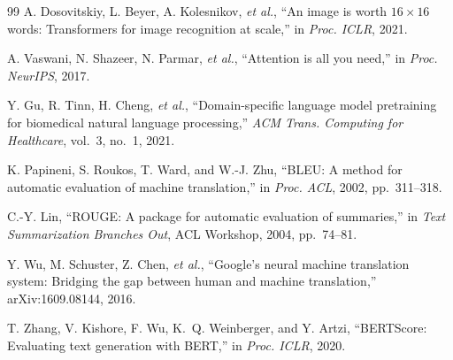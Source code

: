 \documentclass[11pt]{article}
\begin{document}
\begin{thebibliography}{99}
A. Dosovitskiy, L. Beyer, A. Kolesnikov, \emph{et al.},
``An image is worth $16\times16$ words: Transformers for image recognition at
scale,'' in \emph{Proc. ICLR}, 2021.

A. Vaswani, N. Shazeer, N. Parmar, \emph{et al.},
``Attention is all you need,'' in \emph{Proc. NeurIPS}, 2017.

Y. Gu, R. Tinn, H. Cheng, \emph{et al.},
``Domain-specific language model pretraining for biomedical natural language
processing,'' \emph{ACM Trans. Computing for Healthcare}, vol.~3, no.~1, 2021.

K. Papineni, S. Roukos, T. Ward, and W.-J. Zhu,
``BLEU: A method for automatic evaluation of machine translation,''
in \emph{Proc. ACL}, 2002, pp.~311--318.

C.-Y. Lin,
``ROUGE: A package for automatic evaluation of summaries,''
in \emph{Text Summarization Branches Out}, ACL Workshop, 2004, pp.~74--81.

Y. Wu, M. Schuster, Z. Chen, \emph{et al.},
``Google's neural machine translation system: Bridging the gap between human and
machine translation,'' arXiv:1609.08144, 2016.

T. Zhang, V. Kishore, F. Wu, K.~Q. Weinberger, and Y. Artzi,
``BERTScore: Evaluating text generation with BERT,''
in \emph{Proc. ICLR}, 2020.

\end{thebibliography}
\end{document}
